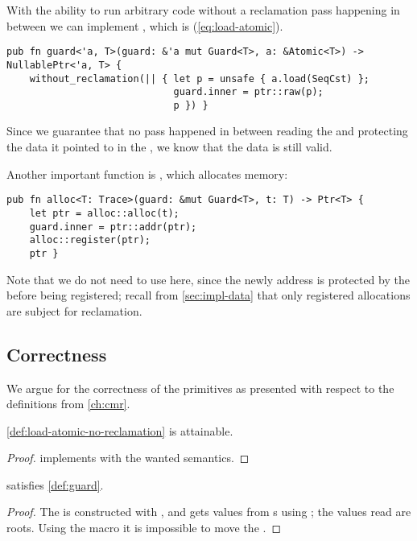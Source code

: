 With the ability to run arbitrary code without a reclamation pass happening in between we can
implement , which is  (\cref{eq:load-atomic}).
\begin{lstlisting}[style=Rust]
pub fn guard<'a, T>(guard: &'a mut Guard<T>, a: &Atomic<T>) -> NullablePtr<'a, T> {
    without_reclamation(|| { let p = unsafe { a.load(SeqCst) };
                             guard.inner = ptr::raw(p);
                             p }) }
\end{lstlisting}
Since we guarantee that no pass happened in between reading the  and protecting the
data it pointed to in the , we know that the data is still valid.


Another important function is , which allocates memory:
\begin{lstlisting}[style=Rust]
pub fn alloc<T: Trace>(guard: &mut Guard<T>, t: T) -> Ptr<T> {
    let ptr = alloc::alloc(t);
    guard.inner = ptr::addr(ptr);
    alloc::register(ptr);
    ptr }
\end{lstlisting}
Note that we do not need to use  here, since the newly address is
protected by the  before being registered; recall from \cref{sec:impl-data} that only
registered allocations are subject for reclamation.




\subsection{Correctness}

We argue for the correctness of the primitives as presented with respect to the definitions from
\cref{ch:cmr}.


\begin{claim}
  \cref{def:load-atomic-no-reclamation} is attainable.
\end{claim}
\begin{proof}
   implements  with the wanted semantics.
\end{proof}

\begin{claim}
   satisfies \cref{def:guard}.
\end{claim}
\begin{proof}
  The  is constructed with , and gets values from s using
  ; the values read are roots.
  Using the  macro it is impossible to move the .
\end{proof}

